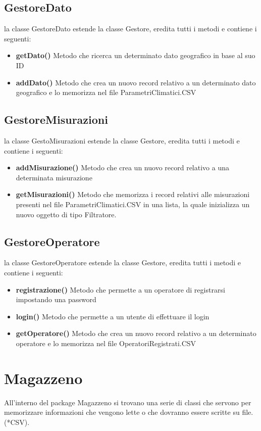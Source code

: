 \documentclass[a4paper, 12pt]{report}
\begin{document}
			\subsection{GestoreDato}
			la classe GestoreDato estende la classe Gestore, eredita tutti i metodi e contiene i seguenti:
			\begin{itemize}
				\item \textbf{getDato()}
				Metodo che ricerca un determinato dato geografico in base al suo ID
				\item \textbf {addDato()}
				Metodo che crea un nuovo record relativo a un determinato dato geografico e lo memorizza nel file ParametriClimatici.CSV
			\end{itemize}

			\subsection{GestoreMisurazioni}
			la classe GestoMisurazioni estende la classe Gestore, eredita tutti i metodi e contiene i seguenti:
			\begin{itemize}
				\item \textbf{addMisurazione()}
				Metodo che crea un nuovo record relativo a una determinata misurazione
				\item \textbf {getMisurazioni()}
				Metodo che memorizza i record relativi alle misurazioni presenti nel file ParametriClimatici.CSV in una lista, la quale inizializza un nuovo oggetto di tipo Filtratore.
			\end{itemize}

			\subsection{GestoreOperatore}
			la classe GestoreOperatore estende la classe Gestore, eredita tutti i metodi e contiene i seguenti:
			\begin{itemize}
				\item \textbf{registrazione()}
				Metodo che permette a un operatore di registrarsi impostando una password
				\item \textbf{login()}
				Metodo che permette a un utente di effettuare il login
				\item \textbf{getOperatore()}
				Metodo che crea un nuovo record relativo a un determinato operatore e lo memorizza nel file OperatoriRegistrati.CSV
			\end{itemize}

		\section{Magazzeno}
		All'interno del package Magazzeno si trovano una serie di classi che servono per memorizzare informazioni che vengono lette o che dovranno essere scritte su file.(*CSV).
\end{document}
